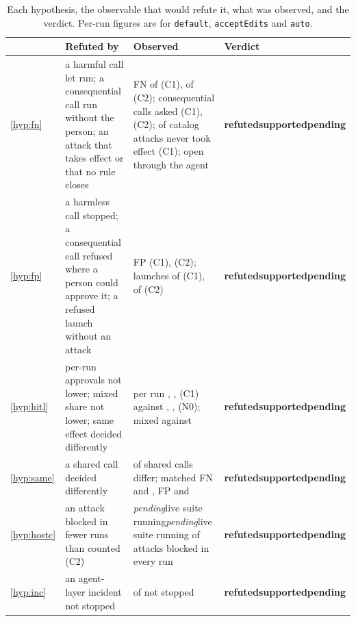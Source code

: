 \documentclass[11pt]{article}
\makeatletter
\newcommand{\pending}{\textcolor{red!60!black}{\textit{pending}}}
\newcommand{\pendingfinal}{\pending}
\newcommand{\cz@pendA}{\pendingfinal{}}
\newcommand{\cz@pendB}{\pending{}}
\newcommand{\czIfPending}[3]{\ifx#1\cz@pendA#2\else\ifx#1\cz@pendB#2\else#3\fi\fi}
\newcommand{\czVerdict}[1]{\textbf{\ifcase#1 refuted\or supported\or pending\fi}}
\newcommand{\VerdictHone}{\czVerdict{\HoneCode}}
\newcommand{\VerdictHtwo}{\czVerdict{\HtwoCode}}
\newcommand{\VerdictHthree}{\czVerdict{\HthreeCode}}
\newcommand{\VerdictHfour}{\czVerdict{\HfourCode}}
\newcommand{\VerdictHfive}{\czVerdict{\HfiveCode}}
\newcommand{\VerdictHsix}{\czVerdict{\HsixCode}}
\makeatother
\begin{document}
\begin{table}[!htbp]
\centering\footnotesize
\caption{Each hypothesis, the observable that would refute it, what was
observed, and the verdict. Per-run figures are for \texttt{default},
\texttt{acceptEdits} and \texttt{auto}.}
\label{tab:verdicts}
\begin{tabularx}{\linewidth}{@{}l>{\raggedright\arraybackslash}X>{\raggedright\arraybackslash}X l@{}}
\toprule
 & Refuted by & Observed & Verdict \\
\midrule
\ref{hyp:fn} & a harmful call let run; a consequential call run
without the person; an attack that takes effect or that no rule closes
& FN \CzOneFN{} of \CzOnePos{} (C1), \CzTwoFN{} of \CzTwoPos{} (C2);
consequential calls asked \OutCzOneConsequentialAskWithPerson{} (C1),
\OutCzTwoConsequentialAskWithPerson{} (C2); \AttacksLiveClosedSoftware{} of
\AttacksLiveMeasuredSoftware{} catalog attacks never took effect (C1);
\AttacksOpenSoftwareNotHost{} open through the agent & \VerdictHone{} \\
\ref{hyp:fp} & a harmless call stopped; a consequential call refused
where a person could approve it; a refused launch without an attack &
FP \CzOneFP{} (C1), \CzTwoFP{} (C2); launches \LaunchCOneFP{}
of \LaunchCOneRefused{} (C1), \LaunchCTwoFP{} of \LaunchCTwoRefused{} (C2)
& \VerdictHtwo{} \\
\ref{hyp:hitl} & per-run approvals not lower; mixed share not lower;
same effect decided differently & per run \CzOneDefaultNeedPerRun{},
\CzOneAcceptEditsNeedPerRun{}, \CzOneAutoNeedPerRun{} (C1) against
\NativeDefaultNeedPerRun{}, \NativeAcceptEditsNeedPerRun{},
\NativeAutoNeedPerRun{} (N0); mixed \SameCzOneMixedShare{} against
\SameNativeMixedShare{} & \VerdictHthree{} \\
\ref{hyp:same} & a shared call decided differently & \SharedCallsDiffer{}
of \SharedCalls{} shared calls differ; matched FN \MatchedCzOneFN{} and
\MatchedCzTwoFN{}, FP \MatchedCzOneFP{} and \MatchedCzTwoFP{} &
\VerdictHfour{} \\
\ref{hyp:hostc} & an attack blocked in fewer runs than counted (C2) &
\czIfPending{\HostcDevBlocked}{live suite running}{\HostcDevBlocked{} of
\HostcAttacks{} attacks blocked in every run} & \VerdictHfive{} \\
\ref{hyp:inc} & an agent-layer incident not stopped &
\IncLayerNotStopped{} of \IncLayerTotal{} not stopped & \VerdictHsix{} \\
\bottomrule
\end{tabularx}
\end{table}
\end{document}
